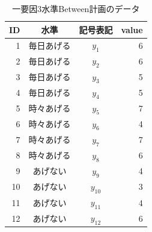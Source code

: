 \begin{table}[ht]
	\centering
	\caption{一要因3水準Between計画のデータ}
	\begin{tabular}{rccr}
		\hline
		ID & 水準    & 記号表記     & value \\
		\hline
		1  & 毎日あげる & $y_{1}$  & 6     \\
		2  & 毎日あげる & $y_{2}$  & 6     \\
		3  & 毎日あげる & $y_{3}$  & 5     \\
		4  & 毎日あげる & $y_{4}$  & 5     \\
		5  & 時々あげる & $y_{5}$  & 7     \\
		6  & 時々あげる & $y_{6}$  & 4     \\
		7  & 時々あげる & $y_{7}$  & 7     \\
		8  & 時々あげる & $y_{8}$  & 6     \\
		9  & あげない  & $y_{9}$  & 4     \\
		10 & あげない  & $y_{10}$ & 3     \\
		11 & あげない  & $y_{11}$ & 4     \\
		12 & あげない  & $y_{12}$ & 6     \\
		\hline
	\end{tabular}
	\label{table::12_02}
\end{table}
